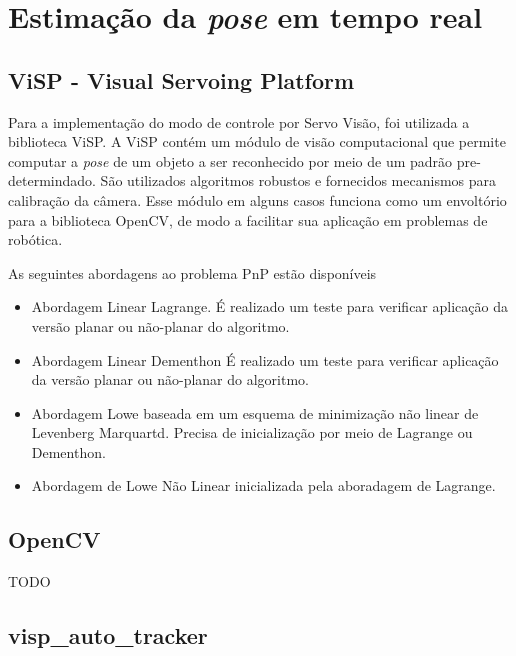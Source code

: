 \chapter{Estimação da \textit{pose} em tempo real}  \label{chap:pose_est}
\section{ViSP - Visual Servoing Platform}

Para a implementação do modo de controle por Servo Visão, foi utilizada a biblioteca ViSP. A ViSP contém um módulo de visão computacional que permite computar a \textit{pose} de um objeto a ser reconhecido por meio de um padrão pre-determindado. São utilizados algoritmos robustos e fornecidos mecanismos para calibração da câmera. Esse módulo em alguns casos funciona como um envoltório para a biblioteca OpenCV, de modo a facilitar sua aplicação em problemas de robótica. 

As seguintes abordagens ao problema PnP estão disponíveis
\begin{itemize}
\item Abordagem Linear Lagrange. É realizado um teste para verificar aplicação da versão planar ou não-planar do algoritmo. 
\item Abordagem Linear Dementhon \cite{dementhon1995model} \cite{oberkampf1996iterative}  É realizado um teste para verificar aplicação da versão planar ou não-planar do algoritmo. 
\item Abordagem Lowe baseada em um esquema de minimização não linear de Levenberg Marquartd. Precisa de inicialização por meio de Lagrange ou Dementhon.
\item  Abordagem de Lowe Não Linear inicializada pela aboradagem de Lagrange.
\end{itemize}

\section{OpenCV}
TODO


\section{visp\_auto\_tracker}